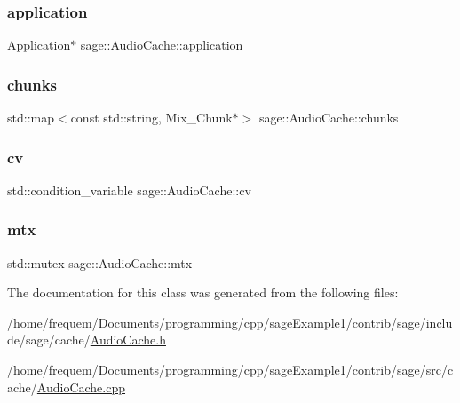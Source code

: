 \subsubsection{\texorpdfstring{application}{application}}
{\footnotesize\ttfamily \mbox{\hyperlink{classsage_1_1Application}{Application}}$\ast$ sage\+::\+Audio\+Cache\+::application\hspace{0.3cm}{\ttfamily [private]}}

\mbox{\label{classsage_1_1AudioCache_a0aed8eaeb96481fe7ecceb6b0d05df69}} 
\subsubsection{\texorpdfstring{chunks}{chunks}}
{\footnotesize\ttfamily std\+::map$<$const std\+::string, Mix\+\_\+\+Chunk$\ast$$>$ sage\+::\+Audio\+Cache\+::chunks\hspace{0.3cm}{\ttfamily [private]}}

\mbox{\label{classsage_1_1AudioCache_a8bf8e2eb17634591e783c20a793c884f}} 
\subsubsection{\texorpdfstring{cv}{cv}}
{\footnotesize\ttfamily std\+::condition\+\_\+variable sage\+::\+Audio\+Cache\+::cv\hspace{0.3cm}{\ttfamily [private]}}

\mbox{\label{classsage_1_1AudioCache_a94ada12c063660c2fd9a0bc3b27f2bfd}} 
\subsubsection{\texorpdfstring{mtx}{mtx}}
{\footnotesize\ttfamily std\+::mutex sage\+::\+Audio\+Cache\+::mtx\hspace{0.3cm}{\ttfamily [private]}}



The documentation for this class was generated from the following files\+:\begin{DoxyCompactItemize}
\item 
/home/frequem/\+Documents/programming/cpp/sage\+Example1/contrib/sage/include/sage/cache/\mbox{\hyperlink{AudioCache_8h}{Audio\+Cache.\+h}}\item 
/home/frequem/\+Documents/programming/cpp/sage\+Example1/contrib/sage/src/cache/\mbox{\hyperlink{AudioCache_8cpp}{Audio\+Cache.\+cpp}}\end{DoxyCompactItemize}
